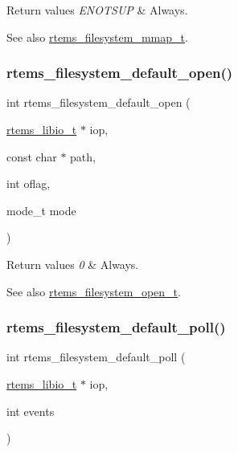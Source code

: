 \begin{DoxyRetVals}{Return values}
{\em E\+N\+O\+T\+S\+UP} & Always.\\
\hline
\end{DoxyRetVals}
\begin{DoxySeeAlso}{See also}
\mbox{\hyperlink{group__LibIOFSHandler_gadfd939c2b1e61acd15671a288a259e96}{rtems\+\_\+filesystem\+\_\+mmap\+\_\+t}}. 
\end{DoxySeeAlso}
\mbox{\label{group__LibIOFSHandler_gadcd852d4f67d04301d03fc9104730389}} 
\subsubsection{\texorpdfstring{rtems\_filesystem\_default\_open()}{rtems\_filesystem\_default\_open()}}
{\footnotesize\ttfamily int rtems\+\_\+filesystem\+\_\+default\+\_\+open (\begin{DoxyParamCaption}\item[{\mbox{\hyperlink{structrtems__libio__tt}{rtems\+\_\+libio\+\_\+t}} $\ast$}]{iop,  }\item[{const char $\ast$}]{path,  }\item[{int}]{oflag,  }\item[{mode\+\_\+t}]{mode }\end{DoxyParamCaption})}


\begin{DoxyRetVals}{Return values}
{\em 0} & Always.\\
\hline
\end{DoxyRetVals}
\begin{DoxySeeAlso}{See also}
\mbox{\hyperlink{group__LibIOFSHandler_gaf95c211266cc1feef5e53066310f9134}{rtems\+\_\+filesystem\+\_\+open\+\_\+t}}. 
\end{DoxySeeAlso}
\mbox{\label{group__LibIOFSHandler_ga608540b3299f81fabee388092bdfbc9f}} 
\subsubsection{\texorpdfstring{rtems\_filesystem\_default\_poll()}{rtems\_filesystem\_default\_poll()}}
{\footnotesize\ttfamily int rtems\+\_\+filesystem\+\_\+default\+\_\+poll (\begin{DoxyParamCaption}\item[{\mbox{\hyperlink{structrtems__libio__tt}{rtems\+\_\+libio\+\_\+t}} $\ast$}]{iop,  }\item[{int}]{events }\end{DoxyParamCaption})}



